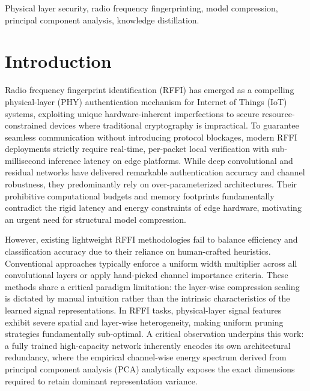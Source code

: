 \documentclass[10pt, conference]{IEEEtran}
\begin{document}
\begin{IEEEkeywords}
Physical layer security, radio frequency fingerprinting, model compression, principal component analysis, knowledge distillation.
\end{IEEEkeywords}


\section{Introduction}
Radio frequency fingerprint identification (RFFI) has emerged as a compelling physical-layer (PHY) authentication mechanism for Internet of Things (IoT) systems, exploiting unique hardware-inherent imperfections to secure resource-constrained devices where traditional cryptography is impractical. 
To guarantee seamless communication without introducing protocol blockages, modern RFFI deployments strictly require real-time, per-packet local verification with sub-millisecond inference latency on edge platforms.
While deep convolutional and residual networks have delivered remarkable authentication accuracy and channel robustness, they predominantly rely on over-parameterized architectures. 
Their prohibitive computational budgets and memory footprints fundamentally contradict the rigid latency and energy constraints of edge hardware, motivating an urgent need for structural model compression.

However, existing lightweight RFFI methodologies fail to balance efficiency and classification accuracy due to their reliance on human-crafted heuristics. 
Conventional approaches typically enforce a uniform width multiplier across all convolutional layers or apply hand-picked channel importance criteria. 
These methods share a critical paradigm limitation: the layer-wise compression scaling is dictated by manual intuition rather than the intrinsic characteristics of the learned signal representations. 
In RFFI tasks, physical-layer signal features exhibit severe spatial and layer-wise heterogeneity, making uniform pruning strategies fundamentally sub-optimal.
A critical observation underpins this work: a fully trained high-capacity network inherently encodes its own architectural redundancy, where the empirical channel-wise energy spectrum derived from principal component analysis (PCA) analytically exposes the exact dimensions required to retain dominant representation variance.
\end{document}
